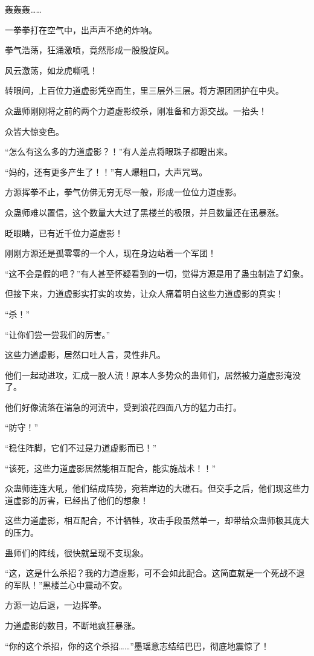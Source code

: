 \begin{this_body}
轰轰轰……

一拳拳打在空气中，出声声不绝的炸响。

拳气浩荡，狂涌激喷，竟然形成一股股旋风。

风云激荡，如龙虎嘶吼！

转眼间，上百位力道虚影凭空而生，里三层外三层。将方源团团护在中央。

众蛊师刚刚将之前的两个力道虚影绞杀，刚准备和方源交战。一抬头！

众皆大惊变色。

“怎么有这么多的力道虚影？！”有人差点将眼珠子都瞪出来。

“妈的，还有更多产生了！！”有人爆粗口，大声咒骂。

方源挥拳不止，拳气仿佛无穷无尽一般，形成一位位力道虚影。

众蛊师难以置信，这个数量大大过了黑楼兰的极限，并且数量还在迅暴涨。

眨眼睛，已有近千位力道虚影！

刚刚方源还是孤零零的一个人，现在身边站着一个军团！

“这不会是假的吧？”有人甚至怀疑看到的一切，觉得方源是用了蛊虫制造了幻象。

但接下来，力道虚影实打实的攻势，让众人痛着明白这些力道虚影的真实！

“杀！”

“让你们尝一尝我们的厉害。”

这些力道虚影，居然口吐人言，灵性非凡。

他们一起动进攻，汇成一股人流！原本人多势众的蛊师们，居然被力道虚影淹没了。

他们好像流落在湍急的河流中，受到浪花四面八方的猛力击打。

“防守！”

“稳住阵脚，它们不过是力道虚影而已！”

“该死，这些力道虚影居然能相互配合，能实施战术！！”

众蛊师连连大吼，他们结成阵势，宛若岸边的大礁石。但交手之后，他们现这些力道虚影的厉害，已经出了他们的想象！

这些力道虚影，相互配合，不计牺牲，攻击手段虽然单一，却带给众蛊师极其庞大的压力。

蛊师们的阵线，很快就呈现不支现象。

“这，这是什么杀招？我的力道虚影，可不会如此配合。这简直就是一个死战不退的军队！”黑楼兰心中震动不安。

方源一边后退，一边挥拳。

力道虚影的数目，不断地疯狂暴涨。

“你的这个杀招，你的这个杀招……”墨瑶意志结结巴巴，彻底地震惊了！


\end{this_body}
